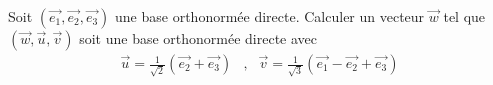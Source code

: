 Soit $(\overrightarrow{e_1},\overrightarrow{e_2},\overrightarrow{e_3})$ une base orthonorm\'ee directe. Calculer un vecteur $\overrightarrow{w}$ tel que $(\overrightarrow{w},\overrightarrow{u},\overrightarrow{v})$ soit une base orthonorm\'ee directe avec
\begin{align*}
 \overrightarrow{u}=\frac{1}{\sqrt{2}}(\overrightarrow{e_2}+\overrightarrow{e_3}) &,& 
 \overrightarrow{v}=\frac{1}{\sqrt{3}}(\overrightarrow{e_1}-\overrightarrow{e_2}+\overrightarrow{e_3})
\end{align*}
\medskip
